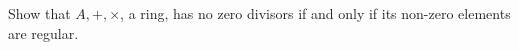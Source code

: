 

Show that \(A, +, \times\), a ring, has no zero divisors if and only if its non-zero elements are regular.